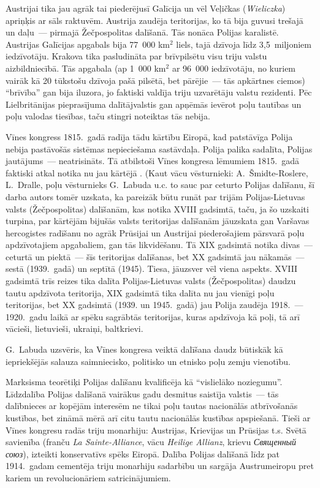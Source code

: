 \documentclass[twoside,a5paper,12pt,fleqn,openany]{extbook}
\newcommand{\pltxti}[1]{\textit{\textpolish{#1}}}
\newcommand{\rutxti}[1]{\textit{\textrussian{#1}}}
\newcommand{\detxti}[1]{\textit{\textgerman{#1}}}
\newcommand{\frtxti}[1]{\textit{\textfrench{#1}}}
\begin{document}
Austrijai tika jau agrāk tai piederējusī Galīcija un vēl Veļičkas (\pltxti{Wieliczka}) apriņķis ar sāls raktuvēm. Austrija zaudēja teritorijas, ko tā bija guvusi trešajā un daļu~--- pirmajā Žečpospolitas dalīšanā. Tās nonāca Polijas karalistē. Austrijas Galīcijas apgabals bija 77~000 km$^{2}$ liels, tajā dzīvoja līdz 3,5~miljoniem iedzīvotāju. Krakova tika pasludināta par brīvpilsētu visu triju valstu aizbildniecībā. Tās apgabala (ap 1~000 km$^{2}$ ar 96~000 iedzīvotāju, no kuriem vairāk kā 20 tūkstošu dzīvoja pašā pilsētā, bet pārējie~--- tās apkārtnes ciemos) ``brīvība'' gan bija iluzora, jo faktiski valdīja triju uzvarētāju valstu rezidenti. Pēc Lielbritānijas pieprasījuma dalītājvalstis gan apņēmās ievērot poļu tautības un poļu valodas tiesības, taču stingri noteiktas tās nebija.

Vīnes kongress 1815.~gadā radīja tādu kārtību Eiropā, kad patstāvīga Polija nebija pastāvošās sistēmas nepieciešama sastāvdaļa. Polija palika sadalīta, Polijas jautājums~--- neatrisināts. Tā atbilstoši Vīnes kongresa lēmumiem 1815.~gadā faktiski atkal notika nu jau kārtējā . (Kaut vācu vēsturnieki: A.~Šmidte-Roslere, L.~Dralle, poļu vēsturnieks G.~Labuda u.c. to sauc par ceturto Polijas dalīšanu, šī darba autors tomēr uzskata, ka pareizāk būtu runāt par trijām Polijas-Lietuvas valsts (Žečpospolitas) dalīšanām, kas notika XVIII gadsimtā, taču, ja šo uzskaiti turpina, par kārtējām bijušās valsts teritorijas dalīšanām jāuzskata gan Varšavas hercogistes radīšanu no agrāk Prūsijai un Austrijai piederošajiem pārsvarā poļu apdzīvotajiem apgabaliem, gan tās likvidēšanu. Tā XIX gadsimtā notika divas~--- ceturtā un piektā~--- šīs teritorijas dalīšanas, bet XX gadsimtā jau nākamās~--- sestā (1939.~gadā) un septītā (1945). Tiesa, jāuzsver vēl viena aspekts. XVIII gadsimtā trīs reizes tika dalīta Polijas-Lietuvas valsts (Žečpospolitas) daudzu tautu apdzīvota teritorija, XIX gadsimtā tika dalīta nu jau vienīgi poļu teritorijas, bet XX gadsimtā (1939. un 1945.~gadā) jau Polija zaudēja 1918.~--- 1920.~gadu laikā ar spēku sagrābtās teritorijas, kuras apdzīvoja kā poļi, tā arī vācieši, lietuvieši, ukraiņi, baltkrievi.

G.~Labuda uzsvēris, ka Vīnes kongresa veiktā dalīšana daudz būtiskāk kā iepriekšējās salauza saimniecisko, politisko un etnisko poļu zemju vienotību.

Marksisma teorētiķi Polijas dalīšanu kvalificēja kā ``vislielāko noziegumu''. Līdzdalība Polijas dalīšanā vairākus gadu desmitus saistīja valstis~--- tās dalībnieces ar kopējām interesēm ne tikai poļu tautas nacionālās atbrīvošanās kustības, bet zināmā mērā arī citu tautu nacionālās kustības apspiešanā. Tieši ar Vīnes kongresu radās triju monarhiju: Austrijas, Krievijas un Prūsijas t.s. Svētā savienība (franču \frtxti{La Sainte-Alliance}, vācu \detxti{Heilige Allianz}, krievu \rutxti{Священный союз}), izteikti konservatīvs spēks Eiropā. Dalība Polijas dalīšanā līdz pat 1914.~gadam cementēja triju monarhiju sadarbību un sargāja Austrumeiropu pret kariem un revolucionāriem satricinājumiem.
\end{document}
